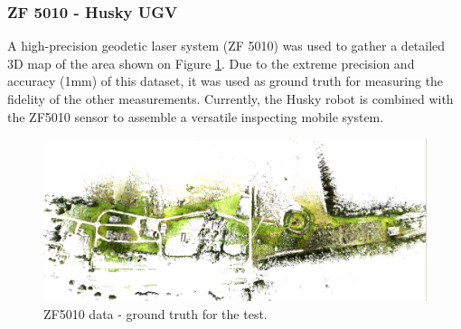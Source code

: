 \documentclass{article}
\begin{document}
\subsubsection{ZF 5010 - Husky UGV}
A high-precision geodetic laser system (ZF 5010) was used to gather a detailed 3D map of the area shown on Figure \ref{fig:HuskyData}. Due to the extreme precision and accuracy (1mm) of this dataset, it was used as ground truth for measuring the fidelity of the other measurements. Currently, the Husky robot is combined with the ZF5010 sensor to assemble a versatile inspecting mobile system.

\begin{figure}
    \centering
    \includegraphics[width=\textwidth]{ROB-15-0035_fig27.png}
    \caption{ZF5010 data - ground truth for the test. }
    \label{fig:HuskyData}
\end{figure}
\end{document}
